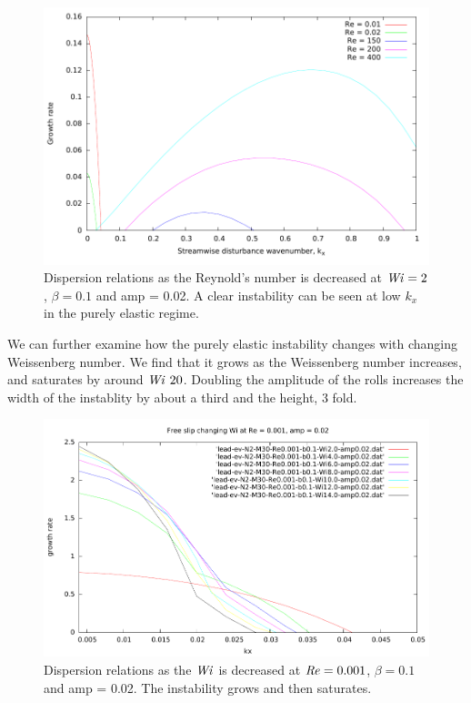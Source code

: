 \documentclass{jfm}
\newcommand\Wi{\mbox{\textit{Wi}}}
\newcommand\Rey{\mbox{\textit{Re}}}  %
\begin{document}
\begin{figure}
    \centering
    \includegraphics[width=\textwidth]{./figures/dispersions_varyRe}
    \caption{Dispersion relations as the Reynold's number is decreased at $\Wi = 2$, $\beta=0.1$ and amp = 0.02. A clear instability can be seen at low $k_{x}$ in the purely elastic regime.}
    \label{fig:dispersions_varyRe}
\end{figure}

We can further examine how the purely elastic instability changes with changing Weissenberg number. We find that it grows as the Weissenberg number increases, and saturates by around $\Wi ~ 20$. Doubling the amplitude of the rolls increases the width of the instablity by about a third and the height, 3 fold.  

\begin{figure}
    \centering
    \includegraphics[width=\textwidth]{./figures/dispersions_varyWi}
    \caption{Dispersion relations as the $\Wi$ is decreased at $\Rey = 0.001$, $\beta=0.1$ and amp = 0.02. The instability grows and then saturates.}
    \label{fig:dispersions_varyWi}
\end{figure}
\end{document}
